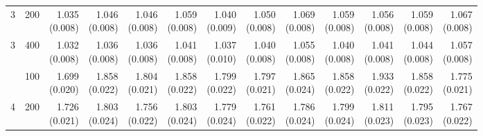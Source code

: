 \begin{table}[p]
{\begin{tabular}{llrrrrrrrrrrr}
3 & 200 & \shortstack{1.035\\(0.008)} & \shortstack{1.046\\(0.008)} & \shortstack{1.046\\(0.008)} & \shortstack{1.059\\(0.008)} & \shortstack{1.040\\(0.009)} & \shortstack{1.050\\(0.008)} & \shortstack{1.069\\(0.008)} & \shortstack{1.059\\(0.008)} & \shortstack{1.056\\(0.008)} & \shortstack{1.059\\(0.008)} & \shortstack{1.067\\(0.008)} \\
3 & 400 & \shortstack{1.032\\(0.008)} & \shortstack{1.036\\(0.008)} & \shortstack{1.036\\(0.008)} & \shortstack{1.041\\(0.008)} & \shortstack{1.037\\(0.010)} & \shortstack{1.040\\(0.008)} & \shortstack{1.055\\(0.008)} & \shortstack{1.040\\(0.008)} & \shortstack{1.041\\(0.008)} & \shortstack{1.044\\(0.008)} & \shortstack{1.057\\(0.008)} \\
\addlinespace
4 & 100 & \shortstack{1.699\\(0.020)} & \shortstack{1.858\\(0.022)} & \shortstack{1.804\\(0.021)} & \shortstack{1.858\\(0.022)} & \shortstack{1.799\\(0.022)} & \shortstack{1.797\\(0.021)} & \shortstack{1.865\\(0.024)} & \shortstack{1.858\\(0.022)} & \shortstack{1.933\\(0.022)} & \shortstack{1.858\\(0.022)} & \shortstack{1.775\\(0.021)} \\
4 & 200 & \shortstack{1.726\\(0.021)} & \shortstack{1.803\\(0.024)} & \shortstack{1.756\\(0.022)} & \shortstack{1.803\\(0.024)} & \shortstack{1.779\\(0.024)} & \shortstack{1.761\\(0.022)} & \shortstack{1.786\\(0.024)} & \shortstack{1.799\\(0.024)} & \shortstack{1.811\\(0.023)} & \shortstack{1.795\\(0.023)} & \shortstack{1.767\\(0.022)} \\

\end{tabular}}
\end{table}
